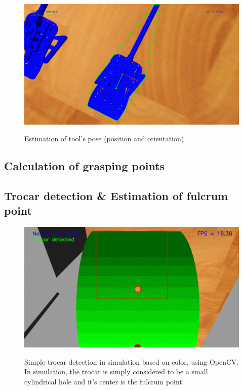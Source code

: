 \begin{center}
\begin{figure}[H]
\centering
\includegraphics[width=12cm]{images/tool-pose.png}\\
\caption{Estimation of tool's pose (position and orientation)}
\end{figure}
\end{center}

\subsection{Calculation of grasping points}

\subsection{Trocar detection \& Estimation of fulcrum point}

\begin{center}
\begin{figure}[H]
\centering
\includegraphics[width=12cm]{images/opencv-trocar-detection.png}\\
\caption{Simple trocar detection in simulation based on color, using OpenCV. In simulation, the trocar is simply considered to be a small 
cylindrical hole and it's center is the fulcrum point}
\end{figure}
\end{center}